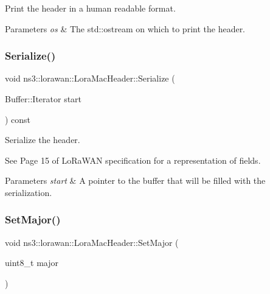 Print the header in a human readable format.


\begin{DoxyParams}{Parameters}
{\em os} & The std\+::ostream on which to print the header. \\
\hline
\end{DoxyParams}
\mbox{\label{classns3_1_1lorawan_1_1LoraMacHeader_ab0e2728e723f7ef538b9c8166a58aeae}} 
\subsubsection{\texorpdfstring{Serialize()}{Serialize()}}
{\footnotesize\ttfamily void ns3\+::lorawan\+::\+Lora\+Mac\+Header\+::\+Serialize (\begin{DoxyParamCaption}\item[{Buffer\+::\+Iterator}]{start }\end{DoxyParamCaption}) const\hspace{0.3cm}{\ttfamily [virtual]}}

Serialize the header.

See Page 15 of Lo\+Ra\+W\+AN specification for a representation of fields.


\begin{DoxyParams}{Parameters}
{\em start} & A pointer to the buffer that will be filled with the serialization. \\
\hline
\end{DoxyParams}
\mbox{\label{classns3_1_1lorawan_1_1LoraMacHeader_a4ea1b076a246aa8cc789aed92886b653}} 
\subsubsection{\texorpdfstring{Set\+Major()}{SetMajor()}}
{\footnotesize\ttfamily void ns3\+::lorawan\+::\+Lora\+Mac\+Header\+::\+Set\+Major (\begin{DoxyParamCaption}\item[{uint8\+\_\+t}]{major }\end{DoxyParamCaption})}

